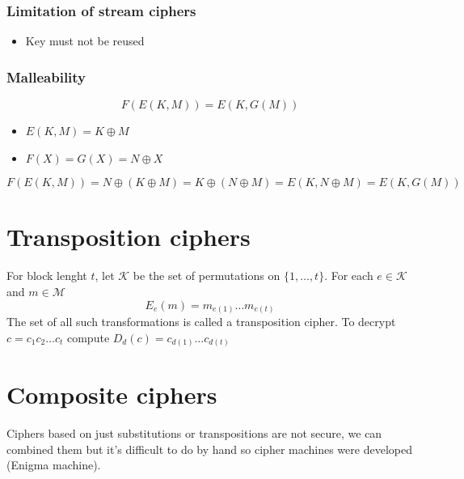 \documentclass[12pt, a4paper]{report}
\begin{document}
\subsubsection{Limitation of stream ciphers}
\begin{itemize}
    \item Key must not be reused
\end{itemize}
\subsubsection{Malleability}
\begin{equation*}
    F(E(K,M)) = E(K,G(M)) 
\end{equation*}
\begin{itemize}
    \item $E(K,M)=K\oplus M$
    \item $F(X)=G(X)=N\oplus X$
\end{itemize}
\begin{equation*}
    F(E(K,M)) = N\oplus (K\oplus M) = K\oplus (N\oplus M) = E(K,N\oplus M) = E(K,G(M))
\end{equation*}
\section{Transposition ciphers}
For block lenght $t$, let $\mathcal{K}$ be the set of permutations on $\{1,\dots,t\}$. For each $e\in\mathcal{K}$ and $m\in\mathcal{M}$
\begin{equation*}
    E_{e}(m) = m_{e(1)}\dots m_{e(t)}
\end{equation*}
The set of all such transformations is called a transposition cipher. To decrypt $c=c_{1}c_{2}\dots c_{t}$ compute $D_{d}(c)=c_{d(1)}\dots c_{d(t)}$
\section{Composite ciphers}
Ciphers based on just substitutions or transpositions are not secure, we can combined them but it's difficult to do by hand so cipher machines were developed (Enigma machine).
\end{document}
